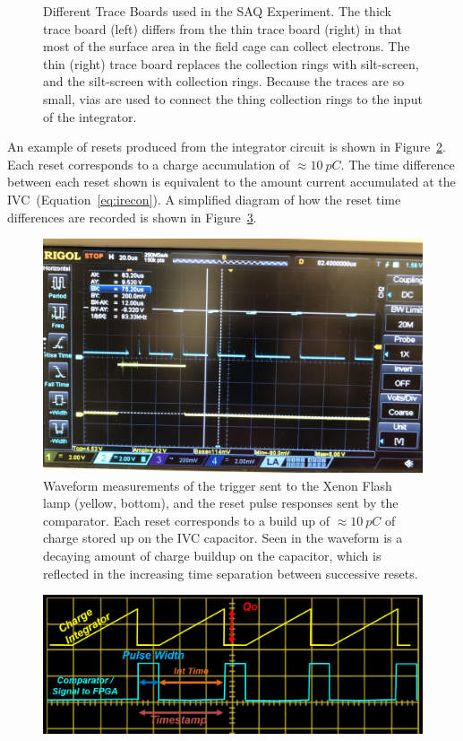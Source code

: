 \begin{figure}[]
\begin{subfigure}{.45\textwidth}
  \caption{}
\end{subfigure}
\caption{Different Trace Boards used in the SAQ Experiment.
The thick trace board (left) differs from the thin trace board (right) in that most of the surface area in the field cage can collect electrons.
The thin (right) trace board replaces the collection rings with silt-screen, and the silt-screen with collection rings.
Because the traces are so small, vias are used to connect the thing collection rings to the input of the integrator.
}
\label{fig:trace_boards}
\end{figure}

An example of resets produced from the integrator circuit is shown in Figure~\ref{fig:saq_resets}.
Each reset corresponds to a charge accumulation of $\approx 10~\unit{pC}$.
The time difference between each reset shown is equivalent to the amount current accumulated at the IVC~(Equation~\ref{eq:irecon}).
A simplified diagram of how the reset time differences are recorded is shown in Figure~\ref{fig:saq_reconstruction}.

\begin{figure}[]
\centering
\includegraphics[width=\textwidth]{images/saq_reset_pulse_gem_thickBoard.jpg}
\caption{Waveform measurements of the trigger sent to the Xenon Flash lamp (yellow, bottom), and the reset pulse responses sent by the comparator.
Each reset corresponds to a build up of $\approx 10~\unit{pC}$ of charge stored up on the IVC capacitor.
Seen in the waveform is a decaying amount of charge buildup on the capacitor, which is reflected in the increasing time separation between successive resets.
}
\label{fig:saq_resets}
\end{figure}

\begin{figure}[]
\centering
\includegraphics[width=\textwidth]{images/saq_example_reconstruction.png}
\caption{}
\label{fig:saq_reconstruction}
\end{figure}


